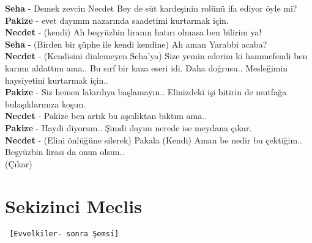\documentclass[]{book}
\begin{document}
\textbf{Seha} - Demek zevcin Necdet Bey de süt kardeşinin rolünü ifa ediyor öyle mi?\\
\textbf{Pakize} - evet dayımın nazarında saadetimi kurtarmak için.\\
\textbf{Necdet} - (kendi) Ah beşyüzbin liranın hatırı olmasa ben bilirim ya!\\
\textbf{Seha} - (Birden bir şüphe ile kendi kendine) Ah aman Yarabbi acaba?\\
\textbf{Necdet} - (Kendisini dinlemeyen Seha'ya) Size yemin ederim ki hanımefendi ben karımı aldattım ama.. Bu sırf bir kaza eseri idi. Daha doğrusu.. Mesleğimin haysiyetini kurtarmak için..\\
\textbf{Pakize} - Siz hemen lakırdıya başlamayın.. Elinizdeki işi bitirin de mutfağa bulaşıklarınıza koşun.\\
\textbf{Necdet} - Pakize ben artık bu aşcılıktan bıktım ama..\\
\textbf{Pakize} - Haydi diyorum.. Şimdi dayım nerede ise meydana çıkar.\\
\textbf{Necdet} - (Elini önlüğüne silerek) Pakala (Kendi) Aman be nedir bu çektiğim.. Beşyüzbin lirası da onun olsun..\\

(Çıkar)

\hypertarget{sekizinci-meclis-1}{%
\section{Sekizinci Meclis}\label{sekizinci-meclis-1}}

\begin{verbatim}
 [Evvelkiler- sonra Şemsi]
\end{verbatim}
\end{document}
